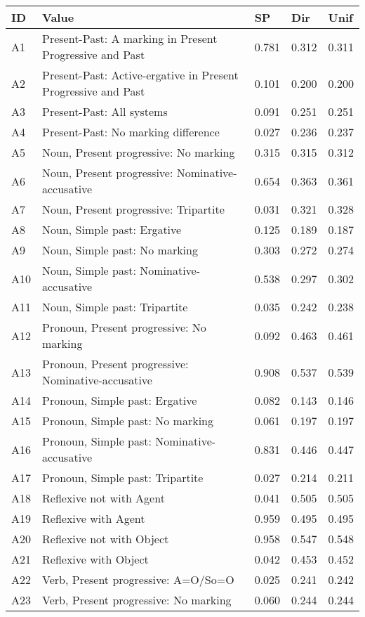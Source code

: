 \begin{longtable}{lllll}
\toprule
ID & Value & SP & Dir & Unif\\
\midrule
A1 & Present-Past: A marking in Present Progressive and Past & 0.781 & 0.312 & 0.311\\
A2 & Present-Past: Active-ergative in Present Progressive and Past & 0.101 & 0.200 & 0.200\\
A3 & Present-Past: All systems & 0.091 & 0.251 & 0.251\\
A4 & Present-Past: No marking difference & 0.027 & 0.236 & 0.237\\
A5 & Noun, Present progressive: No marking & 0.315 & 0.315 & 0.312\\
A6 & Noun, Present progressive: Nominative-accusative & 0.654 & 0.363 & 0.361\\
A7 & Noun, Present progressive: Tripartite & 0.031 & 0.321 & 0.328\\
A8 & Noun, Simple past: Ergative & 0.125 & 0.189 & 0.187\\
A9 & Noun, Simple past: No marking & 0.303 & 0.272 & 0.274\\
A10 & Noun, Simple past: Nominative-accusative & 0.538 & 0.297 & 0.302\\
A11 & Noun, Simple past: Tripartite & 0.035 & 0.242 & 0.238\\
A12 & Pronoun, Present progressive: No marking & 0.092 & 0.463 & 0.461\\
A13 & Pronoun, Present progressive: Nominative-accusative & 0.908 & 0.537 & 0.539\\
A14 & Pronoun, Simple past: Ergative & 0.082 & 0.143 & 0.146\\
A15 & Pronoun, Simple past: No marking & 0.061 & 0.197 & 0.197\\
A16 & Pronoun, Simple past: Nominative-accusative & 0.831 & 0.446 & 0.447\\
A17 & Pronoun, Simple past: Tripartite & 0.027 & 0.214 & 0.211\\
A18 & Reflexive not with Agent & 0.041 & 0.505 & 0.505\\
A19 & Reflexive with Agent & 0.959 & 0.495 & 0.495\\
A20 & Reflexive not with Object & 0.958 & 0.547 & 0.548\\
A21 & Reflexive with Object & 0.042 & 0.453 & 0.452\\
A22 & Verb, Present progressive: A=O/So=O & 0.025 & 0.241 & 0.242\\
A23 & Verb, Present progressive: No marking & 0.060 & 0.244 & 0.244\\

\end{longtable}

